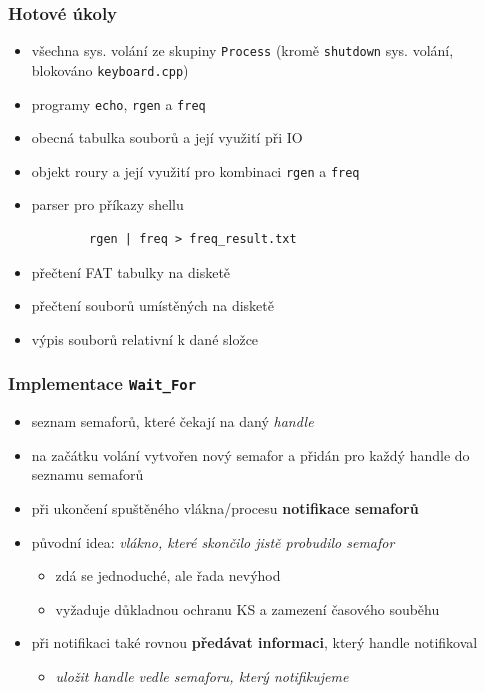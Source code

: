 \documentclass[xcolor=dvipsnames]{beamer}
\begin{document}
\begin{frame}[fragile]
\frametitle{Hotové úkoly}

\begin{itemize}
    \item všechna sys. volání ze skupiny \texttt{Process} (kromě \texttt{shutdown} sys. volání, blokováno \texttt{keyboard.cpp})
    \item programy \texttt{echo}, \texttt{rgen} a \texttt{freq}
    \item obecná tabulka souborů a její využití při IO
    \item objekt roury a její využití pro kombinaci \texttt{rgen} a \texttt{freq}
    \item parser pro příkazy shellu 
    \begin{verbatim}
        rgen | freq > freq_result.txt
    \end{verbatim}
    \item přečtení FAT tabulky na disketě
    \item přečtení souborů umístěných na disketě
    \item výpis souborů relativní k dané složce
\end{itemize}


\end{frame}

\begin{frame}[fragile]
\frametitle{Implementace \texttt{Wait\_For}}
    \begin{itemize}
        \item seznam semaforů, které čekají na daný \textit{handle}
        \item na začátku volání vytvořen nový semafor a přidán pro každý handle do seznamu semaforů
        \item při ukončení spuštěného vlákna/procesu \textbf{notifikace semaforů}
        \item původní idea: \textit{vlákno, které skončilo jistě probudilo semafor}
        \begin{itemize}
            \item zdá se jednoduché, ale řada nevýhod
            \item vyžaduje důkladnou ochranu KS a zamezení časového souběhu
        \end{itemize}
        \item při notifikaci také rovnou \textbf{předávat informaci}, který handle notifikoval
        \begin{itemize}
            \item \textit{uložit handle vedle semaforu, který notifikujeme}
        \end{itemize}   
    \end{itemize}
\end{frame}
\end{document}
